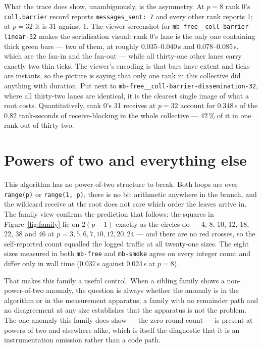 \documentclass[11pt]{article}
\begin{document}
What the trace does show, unambiguously, is the asymmetry. At $p=8$ rank 0's
\texttt{coll.barrier} record reports \texttt{messages\_sent: 7} and every other rank reports 1;
at $p=32$ it is 31 against 1. The viewer screenshot for
\texttt{mb-free\_\_coll-barrier-linear-32} makes the serialisation visual: rank 0's lane is the
only one containing thick green bars --- two of them, at roughly 0.035--0.040\,s and
0.078--0.085\,s, which are the fan-in and the fan-out --- while all thirty-one other lanes carry
exactly two thin ticks. The viewer's encoding is that bars have extent and ticks are instants,
so the picture is saying that only one rank in this collective did anything with duration. Put
next to \texttt{mb-free\_\_coll-barrier-dissemination-32}, where all thirty-two lanes are
identical, it is the clearest single image of what a root costs. Quantitatively, rank 0's 31
receives at $p=32$ account for 0.348\,s of the 0.82 rank-seconds of receive-blocking in the
whole collective --- 42\,\% of it in one rank out of thirty-two.

\section{Powers of two and everything else}

This algorithm has no power-of-two structure to break. Both loops are over \texttt{range(p)} or
\texttt{range(1, p)}, there is no bit arithmetic anywhere in the branch, and the wildcard
receive at the root does not care which order the leaves arrive in. The family view confirms the
prediction that follows: the squares in Figure~\ref{fig:family} lie on $2(p-1)$ exactly as the
circles do --- 4, 8, 10, 12, 18, 22, 38 and 46 at $p = 3, 5, 6, 7, 10, 12, 20, 24$ --- and there
are no red crosses, so the self-reported count equalled the logged traffic at all twenty-one
sizes. The eight sizes measured in both \texttt{mb-free} and \texttt{mb-smoke} agree on every
integer count and differ only in wall time (0.037\,s against 0.024\,s at $p=8$).

That makes this family a useful control. When a sibling family shows a non-power-of-two
anomaly, the question is always whether the anomaly is in the algorithm or in the measurement
apparatus; a family with no remainder path and no disagreement at any size establishes that the
apparatus is not the problem. The one anomaly this family does show --- the zero round count ---
is present at powers of two and elsewhere alike, which is itself the diagnostic that it is an
instrumentation omission rather than a code path.
\end{document}
